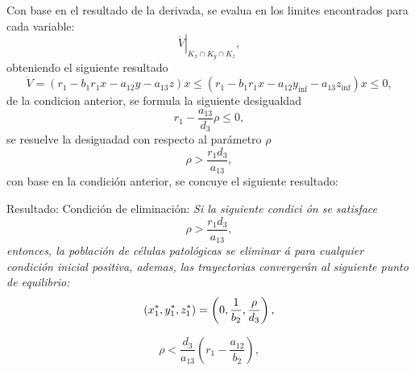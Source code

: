 \documentclass[letterpaper,11pt]{article}
\begin{document}
Con base en el resultado de la derivada, se evalua en los limites
encontrados para cada variable:%
\begin{equation*}
\left. \dot{V}\right\vert _{K_{x}\cap K_{y}\cap K_{z}},
\end{equation*}%
obteniendo el siguiente resultado%
\begin{equation*}
\dot{V}=\left( r_{1}-b_{1}r_{1}x-a_{12}y-a_{13}z\right) x\leq \left(
r_{1}-b_{1}r_{1}x-a_{12}y_{\inf }-a_{13}z_{\inf }\right) x\leq 0,
\end{equation*}%
de la condicion anterior, se formula la siguiente desigualdad%
\begin{equation*}
r_{1}-\frac{a_{13}}{d_{3}}\rho \leq 0,
\end{equation*}%
se resuelve la desiguadad con respecto al par\'{a}metro $\rho $%
\begin{equation*}
\rho >\frac{r_{1}d_{3}}{a_{13}},
\end{equation*}%
con base en la condici\'{o}n anterior, se concuye el siguiente resultado:

\bigskip 

Resultado: Condici\'{o}n de eliminaci\'{o}n: \emph{Si la siguiente condici%
\'{o}n se satisface}%
\begin{equation*}
\rho >\frac{r_{1}d_{3}}{a_{13}},
\end{equation*}%
\emph{entonces, la poblaci\'{o}n de c\'{e}lulas patol\'{o}gicas se eliminar%
\'{a} para cualquier condici\'{o}n inicial positiva, ademas, las
trayectorias converger\'{a}n al siguiente punto de equilibrio:}%
\begin{equation*}
\left( x_{1}^{\ast },y_{1}^{\ast },z_{1}^{\ast }\right) =\left( 0,\frac{1}{%
b_{2}},\frac{\rho }{d_{3}}\right) ,
\end{equation*}

\begin{equation*}
\rho <\frac{d_{3}}{a_{13}}\left( r_{1}-\frac{a_{12}}{b_{2}}\right) ,
\end{equation*}
\end{document}
